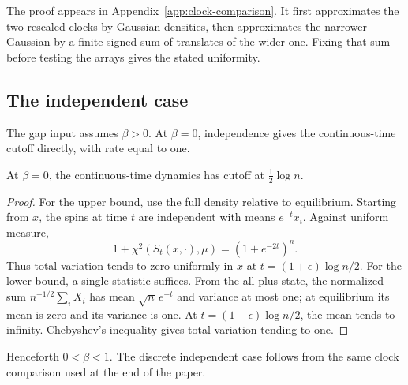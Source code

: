 The proof appears in Appendix~\ref{app:clock-comparison}. It first
approximates the two rescaled clocks by Gaussian densities, then
approximates the narrower Gaussian by a finite signed sum of translates
of the wider one. Fixing that sum before testing the arrays gives the
stated uniformity.


\subsection{The independent case}

The gap input assumes $\beta>0$.  At $\beta=0$, independence gives
the continuous-time cutoff directly, with rate equal to one.

\begin{proposition}
\label{prop:model-independent}
At \(\beta=0\), the continuous-time dynamics has cutoff at
\(\tfrac12\log n\).
\end{proposition}

\begin{proof}
For the upper bound, use the full density relative to equilibrium.
Starting from \(x\), the spins at time \(t\) are independent with
means \(e^{-t}x_i\).  Against uniform measure,
\[
 1+\chi^2(S_t(x,\cdot),\mu)=(1+e^{-2t})^n.
\]
Thus total variation tends to zero uniformly in \(x\) at
\(t=(1+\epsilon)\log n/2\).
For the lower bound, a single statistic suffices.  From the all-plus
state, the normalized sum
\(n^{-1/2}\sum_iX_i\) has mean \(\sqrt n\,e^{-t}\)
and variance at most one; at equilibrium its mean is zero
and its variance is one.
At \(t=(1-\epsilon)\log n/2\), the mean tends to infinity.
Chebyshev's inequality gives total variation tending to one.
\end{proof}

Henceforth \(0<\beta<1\).
The discrete independent case follows from the same clock comparison
used at the end of the paper.
